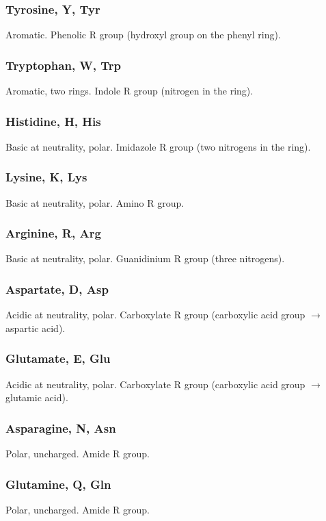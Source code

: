 \documentclass[letterpaper, 12pt]{article}
\begin{document}
\subsubsection*{Tyrosine, Y, Tyr}
Aromatic. Phenolic R group (hydroxyl group on the phenyl ring).

\subsubsection*{Tryptophan, W, Trp}
Aromatic, two rings. Indole R group (nitrogen in the ring).

\subsubsection*{Histidine, H, His}
Basic at neutrality, polar. Imidazole R group (two nitrogens in the ring).

\subsubsection*{Lysine, K, Lys}
Basic at neutrality, polar. Amino R group.

\subsubsection*{Arginine, R, Arg}
Basic at neutrality, polar. Guanidinium R group (three nitrogens).

\subsubsection*{Aspartate, D, Asp}
Acidic at neutrality, polar. Carboxylate R group (carboxylic acid group $\to$ aspartic acid).

\subsubsection*{Glutamate, E, Glu}
Acidic at neutrality, polar. Carboxylate R group (carboxylic acid group $\to$ glutamic acid).

\subsubsection*{Asparagine, N, Asn}
Polar, uncharged. Amide R group.

\subsubsection*{Glutamine, Q, Gln}
Polar, uncharged. Amide R group.
\end{document}
